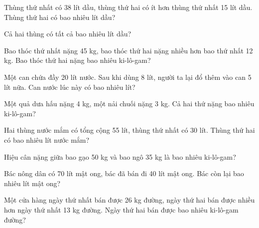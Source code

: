 \begin{ex}
Thùng thứ nhất có 38 lít dầu, thùng thứ hai có ít hơn thùng thứ nhất 15 lít dầu. Thùng thứ hai có bao nhiêu lít dầu?
\end{ex}

\begin{ex}
Cả hai thùng có tất cả bao nhiêu lít dầu?
\end{ex}

\begin{ex}
Bao thóc thứ nhất nặng 45 kg, bao thóc thứ hai nặng nhiều hơn bao thứ nhất 12 kg. Bao thóc thứ hai nặng bao nhiêu ki-lô-gam?
\end{ex}

\begin{ex}
Một can chứa đầy 20 lít nước. Sau khi dùng 8 lít, người ta lại đổ thêm vào can 5 lít nữa. Can nước lúc này có bao nhiêu lít?
\end{ex}

\begin{ex}
Một quả dưa hấu nặng 4 kg, một nải chuối nặng 3 kg. Cả hai thứ nặng bao nhiêu ki-lô-gam?
\end{ex}

\begin{ex}
Hai thùng nước mắm có tổng cộng 55 lít, thùng thứ nhất có 30 lít. Thùng thứ hai có bao nhiêu lít nước mắm?
\end{ex}

\begin{ex}
Hiệu cân nặng giữa bao gạo 50 kg và bao ngô 35 kg là bao nhiêu ki-lô-gam?
\end{ex}

\begin{ex}
Bác nông dân có 70 lít mật ong, bác đã bán đi 40 lít mật ong. Bác còn lại bao nhiêu lít mật ong?
\end{ex}

\begin{ex}
Một cửa hàng ngày thứ nhất bán được 26 kg đường, ngày thứ hai bán được nhiều hơn ngày thứ nhất 13 kg đường. Ngày thứ hai bán được bao nhiêu ki-lô-gam đường?
\end{ex}

